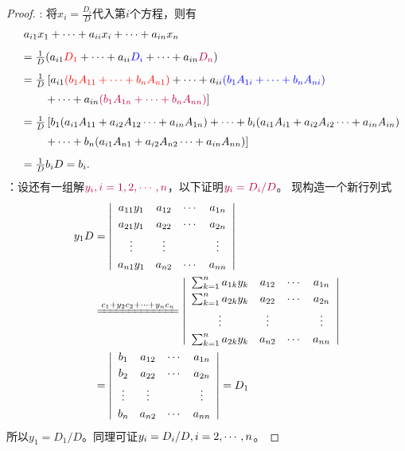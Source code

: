 \begin{proof}
  : 
  将$x_i=\frac{D_i}D$代入第$i$个方程，则有
  $$
  \begin{array}{cl}
    & a_{i1}x_1 +\cdots + a_{ii}x_i + \cdots + a_{in}x_n \\[0.3cm]
    & =   \frac1D(a_{i1}\textcolor{red}{D_1} +\cdots + a_{ii}\textcolor{blue}{D_i} + \cdots + a_{in}\textcolor{purple}{D_n}) \\[0.3cm]
    & =   \frac1D \left[
      a_{i1}\textcolor{red}{(b_1 A_{11}+ \cdots + b_nA_{n1})}
      +\cdots+ a_{ii}\textcolor{blue}{(b_1 A_{1i} + \cdots + b_nA_{ni})}  \right. \\[0.2cm]
    &  \left. \ \ \ \ \ \
      + \cdots + a_{in}\textcolor{purple}{(b_1 A_{1n}+ \cdots + b_nA_{nn})} \right]\\[0.3cm]
    & =   \frac1D \left[
      b_1(a_{i1} A_{11}+ a_{i2} A_{12}  \cdots + a_{in}A_{1n}) 
      +\cdots + b_i(a_{i1} A_{i1}+ a_{i2} A_{i2}  \cdots + a_{in}A_{in})   \right. \\[0.2cm]
    &  \left. \ \ \ \ \ \ + \cdots+ b_n(a_{i1} A_{n1}+ a_{i2} A_{n2}  \cdots + a_{in}A_{nn}) \right] \\[0.3cm]
    & =   \frac 1D b_{i} D = b_i.
  \end{array}
  $$
  ：设还有一组解$\textcolor{purple}{y_i, i = 1, 2, \cdots, n}$，以下证明$\textcolor{purple}{y_i =D_i/D}$。
  现构造一个新行列式
  $$
  \begin{aligned}
    y_1D & =  \left|
      \begin{array}{cccc}
        a_{11}y_1 & a_{12}    &  \cd   &   a_{1n}      \\[0.1cm] 
        a_{21}y_1 & a_{22}    &  \cd   &   a_{2n}      \\[0.1cm] 
        \vd    &    \vd     &        &     \vd      \\[0.1cm] 
        a_{n1}y_1 & a_{n2}    &  \cd   &   a_{nn}      
      \end{array}
    \right| \\
    & \xlongequal{c_1 + y_2 c_2 + \cd + y_n c_n} 
    \left|
      \begin{array}{cccc}
        \sum_{k=1}^n a_{1k}y_k & a_{12}    &  \cd   &   a_{1n}      \\[0.1cm] 
        \sum_{k=1}^n a_{2k}y_k & a_{22}    &  \cd   &   a_{2n}      \\[0.1cm] 
        \vd    &    \vd     &        &     \vd      \\[0.1cm] 
        \sum_{k=1}^n a_{2k}y_k & a_{n2}    &  \cd   &   a_{nn}      
      \end{array}
    \right|  \\
    & = \left|
      \begin{array}{cccc}
        b_1 & a_{12}    &  \cd   &   a_{1n}      \\[0.1cm] 
        b_2 & a_{22}    &  \cd   &   a_{2n}      \\[0.1cm] 
        \vd    &    \vd     &        &     \vd      \\[0.1cm] 
        b_n & a_{n2}    &  \cd   &   a_{nn}      
      \end{array}
    \right|  = D_1
  \end{aligned}
  $$
  所以$y_1 = D_1/D$。同理可证$y_i=D_i/D, i = 2, \cdots, n$。
\end{proof}

